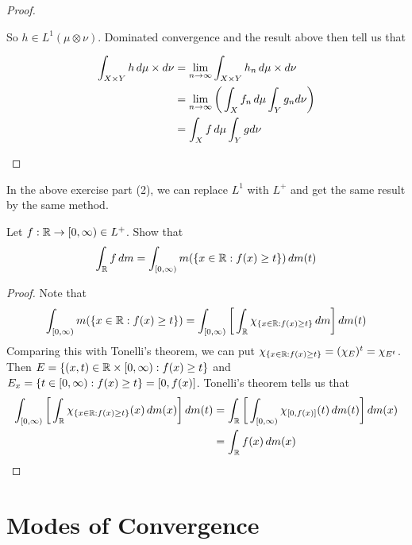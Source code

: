\documentclass{book}
\begin{document}
\begin{proof}
\begin{enumerate}
			So $h \in L^1(\mu \otimes \nu)$. Dominated convergence and the result above then tell us that 
			
			\begin{align*}
				\int_{X \times Y} h \, d \mu \times d\nu 
				&= \lim \limits_{n \rightarrow \infty} \int_{X \times Y} h_n \, d \mu \times d\nu \\
				&= \lim \limits_{n \rightarrow \infty} \bigg( \int_X f_n \, d \mu \int_Y g_n d\nu \bigg)\\
				&= \int_X f \, d \mu \int_Y g d\nu
			\end{align*}
			
		\end{enumerate}
	\end{proof}
	
	\begin{note}
		In the above exercise part (2), we can replace $L^1$ with $L^+$ and get the same result by the same method.
	\end{note}
	
	\begin{ex}  
		Let $f:\mathbb{R} \rightarrow [0,\infty) \in L^+$. Show that $$\int_{\mathbb{R}}f\, d m = \int_{[0,\infty)}m(\{x \in \mathbb{R}: f(x) \geq t\}) \, d m(t)$$
	\end{ex}
	
	\begin{proof}
		Note that $$\int_{[0,\infty)}m(\{x \in \mathbb{R}: f(x) \geq t\}) = \int_{[0,\infty)} \bigg[\int_{\mathbb{R}} \chi_{\{x \in \mathbb{R}: f(x) \geq t\}}\, d m \bigg]\, d m(t)$$
		Comparing this with Tonelli's theorem, we can put $\chi_{\{x \in \mathbb{R}: f(x) \geq t\}} = (\chi_{E})^t = \chi_{E^t}$. Then $E = \{(x,t) \in \mathbb{R} \times [0,\infty): f(x) \geq t\}$ and $E_x = \{t \in [0,\infty): f(x) \geq t\} = [0,f(x)]$. Tonelli's theorem tells us that 
		\begin{align*}
			\int_{[0,\infty)} \bigg[\int_{\mathbb{R}} \chi_{\{x \in \mathbb{R}: f(x) \geq t\}}(x) \, d m(x) \bigg]\, d m(t)
			&= \int_{\mathbb{R}} \bigg[ \int_{[0,\infty)} \chi_{[0,f(x)]}(t) \, d m(t) \bigg] \, d m(x)\\
			&= \int_{\mathbb{R}} f(x) \, d m(x)
		\end{align*} 
	\end{proof}
	
	
	
	
	
	
	
	
	
	
	
	
	
	
	\newpage
	\section{Modes of Convergence}
	
\end{document}
